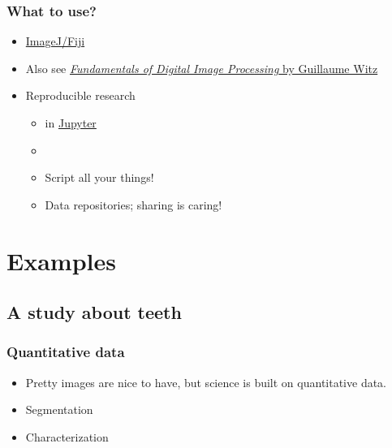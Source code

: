 \begin{frame}
	\frametitle{What to use?}
	\begin{itemize}
		\item \href{http://fiji.sc/}{ImageJ/Fiji}~\cite{Schindelin2012}
		\item Also see \href{https://ilias.unibe.ch/goto_ilias3_unibe_sess_2774485.html}{\emph{Fundamentals of Digital Image Processing} by Guillaume Witz}
		\item Reproducible research
		\begin{itemize}
			\item \href{https://www.python.org/}{\faPython} in \href{https://jupyter.org/}{Jupyter}~\cite{Kluyver2016}
			\item \href{https://git-scm.com/}{\faGit}
			\item Script all your things!
			\item Data repositories; \ie{} sharing is caring!
		\end{itemize}
	\end{itemize}
\end{frame}

\section{Examples}
\subsection{A study about teeth}
\begin{frame}
	\frametitle{Quantitative data}
	\begin{itemize}
		\item Pretty images are nice to have, but science is built on quantitative data.
		\item Segmentation
		\item Characterization
	\end{itemize}	
\end{frame}

